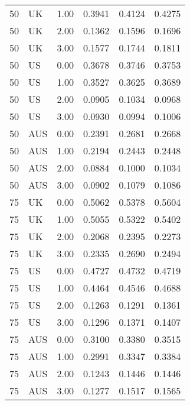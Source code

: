 \begin{table}[ht]
\begin{tabular}{llrlll}
  50 & UK & 1.00 & 0.3941 & 0.4124 & 0.4275 \\ 
  50 & UK & 2.00 & 0.1362 & 0.1596 & 0.1696 \\ 
  50 & UK & 3.00 & 0.1577 & 0.1744 & 0.1811 \\ 
  50 & US & 0.00 & 0.3678 & 0.3746 & 0.3753 \\ 
  50 & US & 1.00 & 0.3527 & 0.3625 & 0.3689 \\ 
  50 & US & 2.00 & 0.0905 & 0.1034 & 0.0968 \\ 
  50 & US & 3.00 & 0.0930 & 0.0994 & 0.1006 \\ 
  50 & AUS & 0.00 & 0.2391 & 0.2681 & 0.2668 \\ 
  50 & AUS & 1.00 & 0.2194 & 0.2443 & 0.2448 \\ 
  50 & AUS & 2.00 & 0.0884 & 0.1000 & 0.1034 \\ 
  50 & AUS & 3.00 & 0.0902 & 0.1079 & 0.1086 \\ 
  75 & UK & 0.00 & 0.5062 & 0.5378 & 0.5604 \\ 
  75 & UK & 1.00 & 0.5055 & 0.5322 & 0.5402 \\ 
  75 & UK & 2.00 & 0.2068 & 0.2395 & 0.2273 \\ 
  75 & UK & 3.00 & 0.2335 & 0.2690 & 0.2494 \\ 
  75 & US & 0.00 & 0.4727 & 0.4732 & 0.4719 \\ 
  75 & US & 1.00 & 0.4464 & 0.4546 & 0.4688 \\ 
  75 & US & 2.00 & 0.1263 & 0.1291 & 0.1361 \\ 
  75 & US & 3.00 & 0.1296 & 0.1371 & 0.1407 \\ 
  75 & AUS & 0.00 & 0.3100 & 0.3380 & 0.3515 \\ 
  75 & AUS & 1.00 & 0.2991 & 0.3347 & 0.3384 \\ 
  75 & AUS & 2.00 & 0.1243 & 0.1446 & 0.1446 \\ 
  75 & AUS & 3.00 & 0.1277 & 0.1517 & 0.1565 \\ 
   \hline
\end{tabular}
\end{table}
